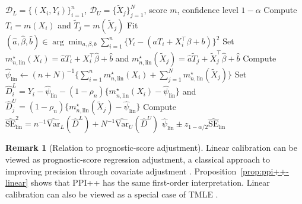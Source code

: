 \documentclass{article}
\theoremstyle{plain}
\theoremstyle{definition}
\newtheorem{remark}{Remark}
\newcommand{\Var}{\mathrm{Var}}
\newcommand{\1}{\mathbbm{1}}
\newcommand{\mhat}{m}
\newcommand{\rhon}{\rho_n}
\begin{document}
\begin{algorithm}[t]
\caption{Linearly calibrated PPI with covariate adjustment}
\label{alg:linearppi}
\begin{algorithmic}[1]
\Require $\mathcal D_L=\{(X_i,Y_i)\}_{i=1}^n$,
$\mathcal D_U=\{\widetilde X_j\}_{j=1}^N$,
score $\mhat$, confidence level $1-\alpha$
\State Compute $T_i=\mhat(X_i)$ and
$\widetilde T_j=\mhat(\widetilde X_j)$
\State Fit
$(\hat a,\hat\beta,\hat b)\in\arg\min_{a,\beta,b}
\sum_{i=1}^n\{Y_i-(aT_i+X_i^\top\beta+b)\}^2$
\State Set
$m_{n,\mathrm{lin}}^\star(X_i)
=\hat aT_i+X_i^\top\hat\beta+\hat b$
and
$m_{n,\mathrm{lin}}^\star(\widetilde X_j)
=\hat a\widetilde T_j+\widetilde X_j^\top\hat\beta+\hat b$
\State Compute
$\widehat\psi_{\mathrm{lin}}\gets
(n+N)^{-1}
\{\sum_{i=1}^n m_{n,\mathrm{lin}}^\star(X_i)
+\sum_{j=1}^N m_{n,\mathrm{lin}}^\star(\widetilde X_j)\}$
\State Set
$\widehat D_i^L=
Y_i-\widehat\psi_{\mathrm{lin}}
-(1-\rhon)\{m_{n,\mathrm{lin}}^\star(X_i)
-\widehat\psi_{\mathrm{lin}}\}$
and
$\widehat D_j^U=
(1-\rhon)\{m_{n,\mathrm{lin}}^\star(\widetilde X_j)
-\widehat\psi_{\mathrm{lin}}\}$
\State Compute
$\widehat{\mathrm{SE}}_{\mathrm{lin}}^2
=n^{-1}\widehat{\Var}_L(\widehat D^L)
+N^{-1}\widehat{\Var}_U(\widehat D^U)$
\State \Return
$\widehat\psi_{\mathrm{lin}}
\pm z_{1-\alpha/2}\widehat{\mathrm{SE}}_{\mathrm{lin}}$
\end{algorithmic}
\end{algorithm}

\begin{remark}[Relation to prognostic-score adjustment]
Linear calibration can be viewed as prognostic-score regression
adjustment, a classical approach to improving precision through
covariate adjustment
\citep{hansen2008prognostic,rosenblum2009using,lin2013agnostic,
schuler2022increasing,balzer2024adaptive,hojbjerre2025powering}.
Proposition~\ref{prop:ppi++-linear} shows that PPI++ has
the same first-order interpretation. Linear calibration can
also be viewed as a special case of TMLE
\citep{hojbjerre2026within}.
\end{remark}
\end{document}
